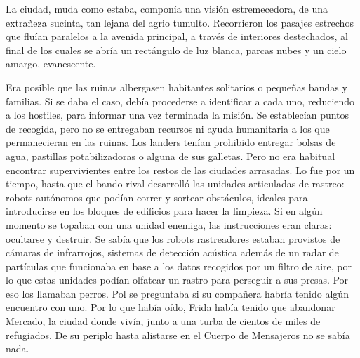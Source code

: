 La ciudad, muda como estaba, componía una visión estremecedora, de una extrañeza sucinta, tan lejana del agrio tumulto. Recorrieron los pasajes estrechos que fluían paralelos a la avenida principal, a través de interiores destechados, al final de los cuales se abría un rectángulo de luz blanca, parcas nubes y un cielo amargo, evanescente. 

Era posible que las ruinas albergasen habitantes solitarios o pequeñas bandas y familias. Si se daba el caso, debía procederse a identificar a cada uno, reduciendo a los hostiles, para informar una vez terminada la misión. Se establecían puntos de recogida, pero no se entregaban recursos ni ayuda humanitaria a los que permanecieran en las ruinas. Los landers tenían prohibido entregar bolsas de agua, pastillas potabilizadoras o alguna de sus galletas. Pero no era habitual encontrar supervivientes entre los restos de las ciudades arrasadas. Lo fue por un tiempo, hasta que el bando rival desarrolló las unidades articuladas de rastreo: robots autónomos que podían correr y sortear obstáculos, ideales para introducirse en los bloques de edificios para hacer la limpieza. Si en algún momento se topaban con una unidad enemiga, las instrucciones eran claras: ocultarse y destruir. Se sabía que los robots rastreadores estaban provistos de cámaras de infrarrojos, sistemas de detección acústica además de un radar de partículas que funcionaba en base a los datos recogidos por un filtro de aire, por lo que estas unidades podían olfatear un rastro para perseguir a sus presas. Por eso los llamaban perros. Pol se preguntaba si su compañera habría tenido algún encuentro con uno. Por lo que había oído, Frida había tenido que abandonar Mercado, la ciudad donde vivía, junto a una turba de cientos de miles de refugiados. De su periplo hasta alistarse en el Cuerpo de Mensajeros no se sabía nada.
